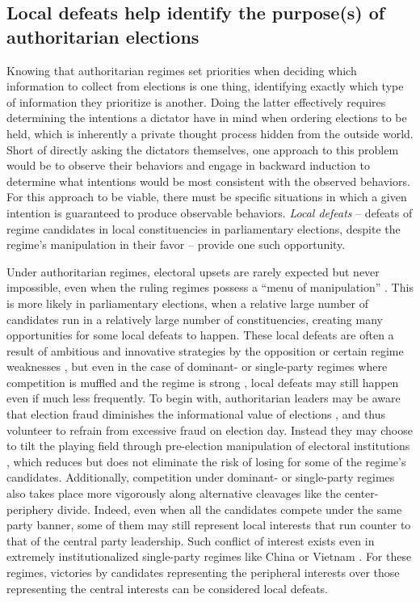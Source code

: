 \documentclass[12pt]{article}
\newcommand{\1}{\mathbbm{1}}
\begin{document}
\subsection{Local defeats help identify the purpose(s) of authoritarian elections}
\label{sec:theory_local_defeat}

Knowing that authoritarian regimes set priorities when deciding which information to collect from elections is one thing, identifying exactly which type of information they prioritize is another. Doing the latter effectively requires determining the intentions a dictator have in mind when ordering elections to be held, which is inherently a private thought process hidden from the outside world. Short of directly asking the dictators themselves, one approach to this problem would be to observe their behaviors and engage in backward induction to determine what intentions would be most consistent with the observed behaviors. For this approach to be viable, there must be specific situations in which a given intention is guaranteed to produce observable behaviors. \textit{Local defeats} -- defeats of regime candidates in local constituencies in parliamentary elections, despite the regime's manipulation in their favor -- provide one such opportunity.

Under authoritarian regimes, electoral upsets are rarely expected but never impossible, even when the ruling regimes possess a ``menu of manipulation'' \citep{Schedler2002menu}. This is more likely in parliamentary elections, when a relative large number of candidates run in a relatively large number of constituencies, creating many opportunities for some local defeats to happen. These local defeats are often a result of ambitious and innovative strategies by the opposition \citep{BunceWolchik2010} or certain regime weaknesses \citep{LevistkyWay2010}, but even in the case of dominant- or single-party regimes where competition is muffled \citep{Schedler2002} and the regime is strong \citep{BunceWolchik2010}, local defeats may still happen even if much less frequently. To begin with, authoritarian leaders may be aware that election fraud diminishes the informational value of elections \citep{Wintrobe2000}, and thus volunteer to refrain from excessive fraud on election day. Instead they may choose to tilt the playing field through pre-election manipulation of electoral institutions \citep{DiazMagaloni2001, Pepinsky2009, MaleskySchuler2011}, which reduces but does not eliminate the risk of losing for some of the regime's candidates. Additionally, competition under dominant- or single-party regimes also takes place more vigorously along alternative cleavages like the center-periphery divide. Indeed, even when all the candidates compete under the same party banner, some of them may still represent local interests that run counter to that of the central party leadership. Such conflict of interest exists even in extremely institutionalized single-party regimes like China \citep{Manion2014} or Vietnam \citep{MaleskySchuler2011}. For these regimes, victories by candidates representing the peripheral interests over those representing the central interests can be considered local defeats.
	
\end{document}
